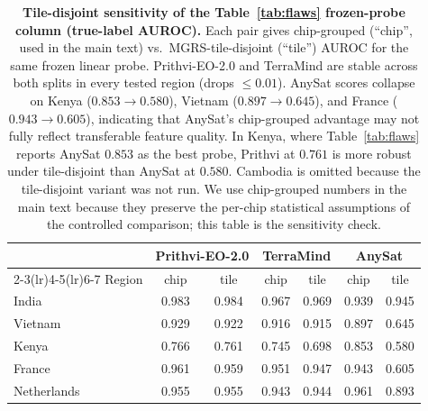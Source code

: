 \documentclass{article}
\begin{document}
\begin{table}[h]\centering\small
\caption{\textbf{Tile-disjoint sensitivity of the Table~\ref{tab:flaws}
frozen-probe column (true-label AUROC).} Each pair gives chip-grouped (``chip'',
used in the main text) vs.\ MGRS-tile-disjoint (``tile'') AUROC for the same frozen
linear probe. Prithvi-EO-2.0 and TerraMind are stable across both splits in every
tested region (drops $\le 0.01$). AnySat scores collapse on Kenya
($0.853 \to 0.580$), Vietnam ($0.897 \to 0.645$), and France ($0.943 \to 0.605$),
indicating that AnySat's chip-grouped advantage may not fully reflect transferable
feature quality. In Kenya, where Table~\ref{tab:flaws} reports AnySat $0.853$ as the
best probe, Prithvi at $0.761$ is more robust under tile-disjoint than AnySat at
$0.580$. Cambodia is omitted because the tile-disjoint variant was not run. We use
chip-grouped numbers in the main text because they preserve the per-chip statistical
assumptions of the controlled comparison; this table is the sensitivity check.}
\label{tab:tilesplit}
\begin{tabular}{lcccccc}
\toprule
        & \multicolumn{2}{c}{Prithvi-EO-2.0} & \multicolumn{2}{c}{TerraMind} & \multicolumn{2}{c}{AnySat} \\
\cmidrule(lr){2-3}\cmidrule(lr){4-5}\cmidrule(lr){6-7}
Region  & chip & tile & chip & tile & chip & tile \\
\midrule
India       & 0.983 & 0.984 & 0.967 & 0.969 & 0.939 & 0.945 \\
Vietnam     & 0.929 & 0.922 & 0.916 & 0.915 & 0.897 & 0.645 \\
Kenya       & 0.766 & 0.761 & 0.745 & 0.698 & 0.853 & 0.580 \\
France      & 0.961 & 0.959 & 0.951 & 0.947 & 0.943 & 0.605 \\
Netherlands & 0.955 & 0.955 & 0.943 & 0.944 & 0.961 & 0.893 \\
\bottomrule
\end{tabular}
\end{table}
\end{document}
